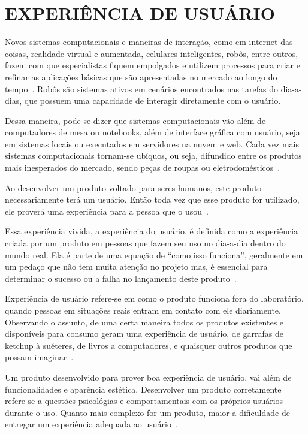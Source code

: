 \chapter{EXPERIÊNCIA DE USUÁRIO}
\label{cap:ux}
Novos sistemas computacionais e maneiras de interação, como em internet das coisas, realidade virtual e aumentada, celulares inteligentes, robôs, entre outros, fazem com que especialistas fiquem empolgados e utilizem processos para criar e refinar as aplicações básicas que são apresentadas no mercado ao longo do tempo~\cite{hartson:2012}. Robôs são sistemas ativos em cenários encontrados nas tarefas do dia-a-dias, que possuem uma capacidade de interagir diretamente com o usuário.

Dessa maneira, pode-se dizer que sistemas computacionais vão além de computadores de mesa ou notebooks, além de interface gráfica com usuário, seja em sistemas locais ou executados em servidores na nuvem e web. Cada vez mais sistemas computacionais tornam-se ubíquos, ou seja, difundido entre os produtos mais inesperados do mercado, sendo peças de roupas ou eletrodomésticos~\cite{hartson:2012}.

Ao desenvolver um produto voltado para seres humanos, este produto necessariamente terá um usuário. Então toda vez que esse produto for utilizado, ele proverá uma experiência para a pessoa que o usou~\cite{garrett:2010}.

Essa experiência vivida, a experiência do usuário, é definida como a experiência criada por um produto em pessoas que fazem seu uso no dia-a-dia dentro do mundo real. Ela é parte de uma equação de ``como isso funciona'', geralmente em um pedaço que não tem muita atenção no projeto mas, é essencial para determinar o sucesso ou a falha no lançamento deste produto~\cite{garrett:2010}.

Experiência de usuário refere-se em como o produto funciona fora do laboratório, quando pessoas em situações reais entram em contato com ele diariamente. Observando o assunto, de uma certa maneira todos os produtos existentes e disponíveis para consumo geram uma experiência de usuário, de garrafas de ketchup à suéteres, de livros a computadores, e quaisquer outros produtos que possam imaginar~\cite{garrett:2010, albert:2013}.

Um produto desenvolvido para prover boa experiência de usuário, vai além de funcionalidades e aparência estética. Desenvolver um produto corretamente refere-se a questões psicológias e comportamentais com os próprios usuários durante o uso. Quanto mais complexo for um produto, maior a dificuldade de entregar um experiência adequada ao usuário~\cite{garrett:2010, allen:2012}.

